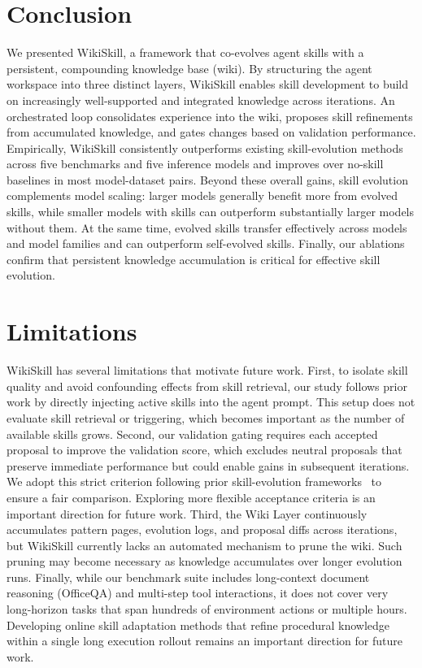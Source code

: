 \documentclass[11pt, a4paper, copyright, gr]{google}
\newcommand{\method}{WikiSkill\xspace}
\begin{document}
\vspace{-5pt}

\section{Conclusion}

We presented \method, a framework that co-evolves agent skills with a persistent, compounding knowledge base (wiki). By structuring the agent workspace into three distinct layers, \method enables skill development to build on increasingly well-supported and integrated knowledge across iterations. An orchestrated loop consolidates experience into the wiki, proposes skill refinements from accumulated knowledge, and gates changes based on validation performance. Empirically, \method consistently outperforms existing skill-evolution methods across five benchmarks and five inference models and improves over no-skill baselines in most model-dataset pairs. Beyond these overall gains, skill evolution complements model scaling: larger models generally benefit more from evolved skills, while smaller models with skills can outperform substantially larger models without them. At the same time, evolved skills transfer effectively across models and model families and can outperform self-evolved skills. Finally, our ablations confirm that persistent knowledge accumulation is critical for effective skill evolution.


\vspace{-5pt}
\section*{Limitations}

\method has several limitations that motivate future work. First, to isolate skill quality and avoid confounding effects from skill retrieval, our study follows prior work by directly injecting active skills into the agent prompt. This setup does not evaluate skill retrieval or triggering, which becomes important as the number of available skills grows. Second, our validation gating requires each accepted proposal to improve the validation score, which excludes neutral proposals that preserve immediate performance but could enable gains in subsequent iterations. We adopt this strict criterion following prior skill-evolution frameworks~\citep{yang2026skillopt,alzubi2026evoskill} to ensure a fair comparison. Exploring more flexible acceptance criteria is an important direction for future work. Third, the Wiki Layer continuously accumulates pattern pages, evolution logs, and proposal diffs across iterations, but WikiSkill currently lacks an automated mechanism to prune the wiki. Such pruning may become necessary as knowledge accumulates over longer evolution runs. Finally, while our benchmark suite includes long-context document reasoning (OfficeQA) and multi-step tool interactions, it does not cover very long-horizon tasks that span hundreds of environment actions or multiple hours. Developing online skill adaptation methods that refine procedural knowledge within a single long execution rollout remains an important direction for future work.
\end{document}
